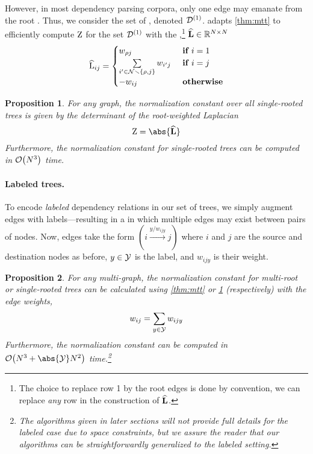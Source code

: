 \documentclass[11pt,a4paper]{article}
\newtheorem{prop}{Proposition}
\theoremstyle{definition}
\begin{document}
However, in most dependency parsing corpora, 
only one edge may emanate from the root \citep{ud,zmigrod2020mind}.
Thus, we consider the set of , denoted ${\mathcal{D}}^{(1)}$.
\citet{koo-et-al-2007} adapts \cref{thm:mtt} to efficiently compute ${\mathrm{Z}}$ for the set ${\mathcal{D}}^{(1)}$ with the ,\footnote{The choice to replace row 1 by the root edges is done by convention, we can replace \emph{any} row in the construction of ${\mathbf{\widehat{L}}}$.} ${\mathbf{\widehat{L}}}\in\mathbb{R}^{{N}\times {N}}$
\begin{equation}\label{eq:root-weighted-laplacian}
    {\widehat{\mathrm{L}}_{ij}}=
    \begin{cases}
    {w_{{\rho}j}} & \textbf{ if } i=1 \\
    \sum\limits_{i'\in{\mathcal{N}}\smallsetminus\{{\rho},j\}}{w_{i'j}} & \textbf{ if } i=j \\
    -{w_{ij}} & \textbf{ otherwise}
    \end{cases}
\end{equation}

\begin{prop}\label{prop:mtt-root-weighted-laplacian}
For any graph, the normalization constant over all single-rooted trees is given by the determinant of the root-weighted Laplacian \cite[Prop. 1]{koo-et-al-2007}
\begin{equation}
    \wbar=\abs{\laphat}
\end{equation}
Furthermore, the normalization constant for single-rooted trees can be computed in $\mathcal{O}\!\left({N}^3\right)$ time.
\end{prop}


\paragraph{Labeled trees.}
To encode \emph{labeled} dependency relations in our set of trees, we simply augment edges with labels---resulting in a  in which multiple edges may exist between pairs of nodes.
Now, edges take the form $(i\!\xrightarrow[]{y / w_{ijy}}\!j)$ where $i$ and $j$ are the source and destination nodes as before, $y \in {\mathcal{Y}}$ is the label, and $w_{ijy}$ is their weight.
\begin{prop}\label{prop:labeled-mtt}
For any multi-graph, the normalization constant for multi-root or single-rooted trees
can be calculated using \cref{thm:mtt} or \cref{prop:mtt-root-weighted-laplacian} (respectively) 
with the edge weights,
\begin{equation}
    {w_{ij}}=\sum_{y\in{\mathcal{Y}}}{w_{ijy}}
\end{equation}
Furthermore, the normalization constant can be computed in $\bigo{\nN^3 + \abs{\lab} \nN^2}$ time.\footnote{The algorithms given in later sections will not provide full details for the labeled case due to space constraints, but we assure the reader that our algorithms can be straightforwardly generalized to the labeled setting.}
\end{prop}
\end{document}
